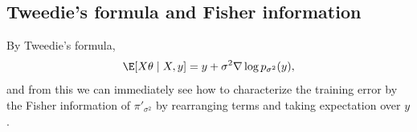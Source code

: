 \documentclass[11pt]{article}
\newcommand{\bysest}{\what{\theta}_{\mathsf{B}}}
\newcommand{\trerr}{\mathsf{Train}}
\newcommand{\de}{\mathrm{d}}
\begin{document}
\subsection{Tweedie's formula and Fisher information} \label{sec:Tweedie}
By Tweedie's formula,
$$
\E [X\theta \mid X, y] = y + \sigma^2 \nabla \log p_{\sigma^2}(y),
$$
and from this we can immediately see how to characterize the training error by the Fisher information of $\pi'_{\sigma^2}$ by rearranging terms and taking expectation over $y$. 
\end{document}
